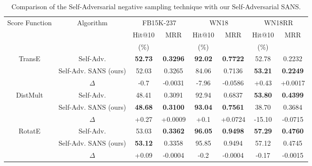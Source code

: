 \begin{table*}[h]
\begin{small}
\centering
\begin{tabular}{cccccccc}
\hline
\multirow{3}{2cm}{\centering Score Function}& \multirow{3}{2cm}{Algorithm} & \multicolumn{2}{c}{FB15K-237} & \multicolumn{2}{c}{WN18} & \multicolumn{2}{c}{WN18RR} \\
& & Hit@10 & \multirow{2}{1cm}{\centering MRR} & Hit@10 & \multirow{2}{1cm}{\centering MRR} & Hit@10 & \multirow{2}{1cm}{\centering MRR} \\ 
& & (\%) & & (\%) & & (\%) & \\
\hline
\multirow{3}{1.5cm}{\centering TransE} & Self-Adv. \cite{sun2019rotate} & \textbf{52.73} & \textbf{0.3296} & \textbf{92.02} & \textbf{0.7722} & 52.78 & 0.2232 \\
& Self-Adv. SANS (ours) & 52.03 & 0.3265 & 84.06 & 0.7136 & \textbf{53.21} & \textbf{0.2249} \\
& $\Delta$ & \cellcolor{mistyrose}-0.7 & \cellcolor{mistyrose}-0.0031 & \cellcolor{mistyrose}-7.96 &	\cellcolor{mistyrose} -0.0586 & \cellcolor{palegreen}+0.43 & \cellcolor{palegreen}+0.0017 \\
\hline
\multirow{3}{1.5cm}{\centering DistMult} & Self-Adv. & 48.41 & 0.3091 & 92.94  & 0.6837 & \textbf{53.80} & \textbf{0.4399} \\
& Self-Adv. SANS (ours) & \textbf{48.68} & \textbf{0.3100} & \textbf{93.04} & \textbf{0.7561} & 38.70 & 0.3684 \\
& $\Delta$ & \cellcolor{palegreen}+0.27 & \cellcolor{palegreen} +0.0009 & \cellcolor{palegreen}+0.1 &	\cellcolor{palegreen}+0.0724 & \cellcolor{mistyrose} -15.10 & \cellcolor{mistyrose}-0.0715 \\
\hline
\multirow{3}{1cm}{\centering RotatE} & Self-Adv. & 53.03 & \textbf{0.3362} & \textbf{96.05}& \textbf{0.9498} & \textbf{57.29} & \textbf{0.4760} \\
& Self-Adv. SANS (ours) & \textbf{53.12} & 0.3358 & 95.85 & 0.9494 & 57.12 & 0.4745 \\
& $\Delta$ & \cellcolor{palegreen}+0.09 & \cellcolor{mistyrose}-0.0004 &  \cellcolor{mistyrose}-0.2 & \cellcolor{mistyrose}-0.0004	& \cellcolor{mistyrose}-0.17	& \cellcolor{mistyrose}-0.0015 \\
\hline
\end{tabular}
\caption{Comparison of the Self-Adversarial negative sampling technique with our Self-Adversarial SANS. 
}
\label{tab:comp_adv}
\end{small}
\end{table*}
